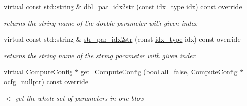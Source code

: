 \begin{Indent}
\begin{DoxyCompactItemize}
virtual const std\+::string \& \mbox{\hyperlink{class_s_m_spp__di__unipi__it_1_1_f_real_objective_a93f1297e7910e91cc18b303376191026}{dbl\+\_\+par\+\_\+idx2str}} (const \mbox{\hyperlink{class_s_m_spp__di__unipi__it_1_1_thin_compute_interface_aa3d710629ad8c434286726ad810c3b47}{idx\+\_\+type}} idx) const override
\begin{DoxyCompactList}\small\item\em returns the string name of the double parameter with given index \end{DoxyCompactList}\item 
virtual const std\+::string \& \mbox{\hyperlink{class_s_m_spp__di__unipi__it_1_1_f_real_objective_a216c7c4b025d1bc2e3b1a89dc2c1d46f}{str\+\_\+par\+\_\+idx2str}} (const \mbox{\hyperlink{class_s_m_spp__di__unipi__it_1_1_thin_compute_interface_aa3d710629ad8c434286726ad810c3b47}{idx\+\_\+type}} idx) const override
\begin{DoxyCompactList}\small\item\em returns the string name of the string parameter with given index \end{DoxyCompactList}\item 
virtual \mbox{\hyperlink{class_s_m_spp__di__unipi__it_1_1_compute_config}{Compute\+Config}} $\ast$ \mbox{\hyperlink{class_s_m_spp__di__unipi__it_1_1_f_real_objective_af420d3dff49afbccc8a0c2de86374eeb}{get\+\_\+\+Compute\+Config}} (bool all=false, \mbox{\hyperlink{class_s_m_spp__di__unipi__it_1_1_compute_config}{Compute\+Config}} $\ast$ocfg=nullptr) const override
\begin{DoxyCompactList}\small\item\em $<$ get the whole set of parameters in one blow \end{DoxyCompactList}\end{DoxyCompactItemize}
\end{Indent}
